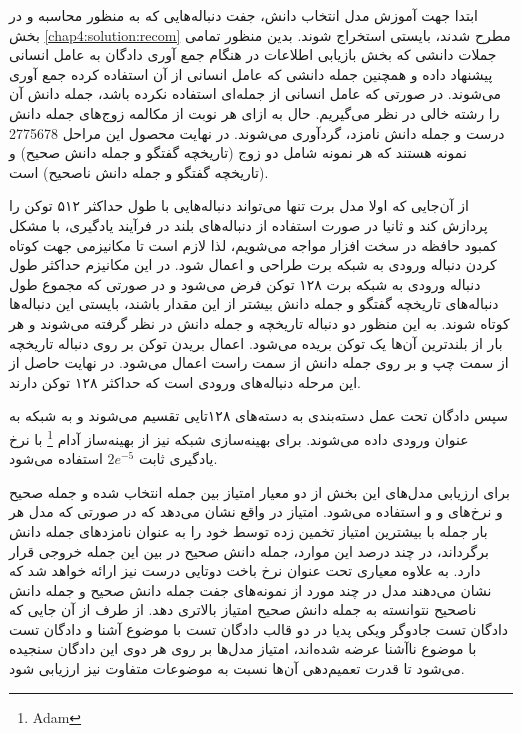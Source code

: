  ابتدا جهت آموزش مدل انتخاب دانش،‌ جفت دنباله‌هایی که به منظور محاسبه 
 و
 در بخش 
 \ref{chap4:solution:recom}
 مطرح شدند، بایستی استخراج شوند. بدین منظور تمامی جملات دانشی که بخش بازیابی اطلاعات در هنگام جمع آوری دادگان به عامل انسانی پیشنهاد داده و همچنین جمله دانشی که عامل انسانی از آن استفاده کرده جمع آوری می‌شوند. در صورتی که عامل انسانی از جمله‌ای استفاده نکرده باشد،‌ جمله دانش آن را رشته خالی در نظر می‌گیریم. حال به ازای هر نوبت از مکالمه زوج‌های جمله دانش درست و جمله دانش نامزد، گردآوری می‌شوند. در نهایت محصول این مراحل 2775678 نمونه هستند که هر نمونه شامل دو زوج (تاریخچه گفتگو و جمله دانش صحیح) و (تاریخچه گفتگو و جمله دانش ناصحیح) است. 
 

از آن‌جایی که اولا مدل برت تنها می‌تواند دنباله‌هایی با طول حداکثر ۵۱۲ توکن را پردازش کند و ثانیا در صورت استفاده از دنباله‌های بلند در فرآیند یادگیری، با مشکل کمبود حافظه در سخت افزار مواجه می‌شویم، لذا لازم است تا مکانیزمی جهت کوتاه کردن دنباله ورودی به شبکه برت طراحی و اعمال شود. در این مکانیزم حداکثر طول دنباله ورودی به شبکه برت ۱۲۸ توکن فرض می‌شود و در صورتی که مجموع طول دنباله‌های تاریخچه گفتگو و جمله دانش بیشتر از این مقدار باشند، بایستی این دنباله‌ها کوتاه شوند. به این منظور دو دنباله تاریخچه و جمله دانش در نظر گرفته می‌شوند و هر بار از بلندترین آن‌ها یک توکن بریده می‌شود. اعمال بریدن توکن بر روی دنباله تاریخچه از سمت چپ و بر روی جمله دانش از سمت راست اعمال می‌شود. در نهایت حاصل از این مرحله دنباله‌های ورودی است که حداکثر ۱۲۸ توکن دارند. 

سپس دادگان تحت عمل دسته‌بندی به دسته‌های ۱۲۸تایی تقسیم می‌شوند و به شبکه به عنوان ورودی داده می‌شوند. برای بهینه‌سازی شبکه نیز از بهینه‌ساز آدام
\footnote{Adam}
با نرخ یادگیری ثابت 
$2e^{-5}$
استفاده می‌شود.

برای ارزیابی مدل‌های این بخش از دو معیار امتیاز
بین جمله انتخاب شده و جمله صحیح
و نرخ‌های 
 و  و 
استفاده می‌شود. امتیاز
در واقع نشان می‌دهد که در صورتی که مدل هر بار 
جمله  با بیشترین امتیاز تخمین زده توسط خود را به عنوان نامزد‌های جمله دانش برگرداند، در چند درصد این موارد، جمله دانش صحیح در بین این 
جمله خروجی قرار دارد. 
به علاوه معیاری تحت عنوان نرخ باخت دوتایی درست نیز ارائه خواهد شد که نشان می‌دهند مدل در چند مورد از نمونه‌های جفت جمله دانش صحیح و جمله دانش ناصحیح نتوانسته به جمله دانش صحیح امتیاز بالاتری دهد. 
از طرف از آن‌ جایی که دادگان تست جادوگر ویکی پدیا در دو قالب دادگان تست با موضوع آشنا و دادگان تست با موضوع ناآشنا عرضه شده‌اند، امتیاز مدل‌ها بر روی هر دوی این دادگان سنجیده می‌شود تا قدرت تعمیم‌دهی آن‌ها نسبت به موضوعات متفاوت نیز ارزیابی شود.  

